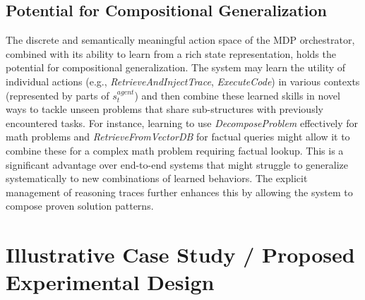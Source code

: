 \documentclass[11pt]{article}
\begin{document}
\subsection{Potential for Compositional Generalization}
\label{ssec:tg_compositional_generalization}
The discrete and semantically meaningful action space of the MDP orchestrator, combined with its ability to learn from a rich state representation, holds the potential for compositional generalization. The system may learn the utility of individual actions (e.g., \emph{RetrieveAndInjectTrace}, \emph{ExecuteCode}) in various contexts (represented by parts of $s_t^{agent}$) and then combine these learned skills in novel ways to tackle unseen problems that share sub-structures with previously encountered tasks. For instance, learning to use \emph{DecomposeProblem} effectively for math problems and \emph{RetrieveFromVectorDB} for factual queries might allow it to combine these for a complex math problem requiring factual lookup. This is a significant advantage over end-to-end systems that might struggle to generalize systematically to new combinations of learned behaviors. The explicit management of reasoning traces further enhances this by allowing the system to compose proven solution patterns.

\section{Illustrative Case Study / Proposed Experimental Design}
\label{sec:case_study}
\end{document}
